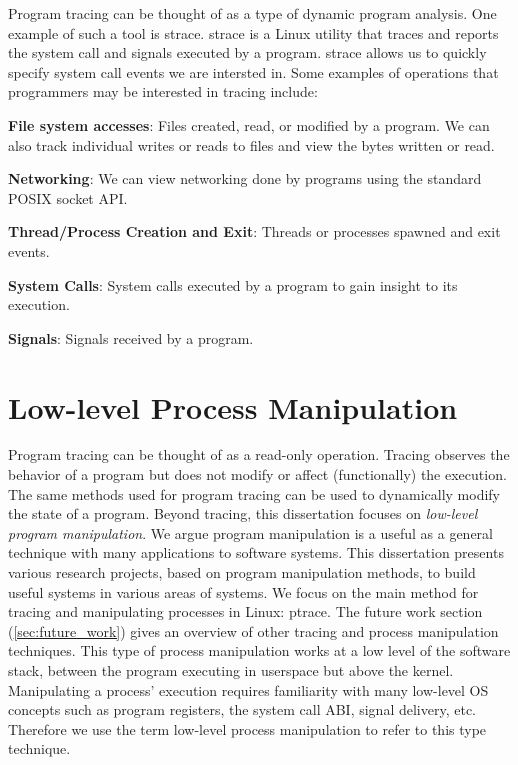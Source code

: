 Program tracing can be thought of as a type of dynamic program analysis. One example of such a tool is strace. strace is a Linux utility that traces and reports the system call and signals executed by a program. strace allows us to quickly specify system call events we are intersted in. Some examples of operations that programmers may be interested in tracing include:
\begin{compactitem}
\item \textbf{File system accesses}: Files created, read, or modified by a program. We can also track individual writes or reads to files and view the bytes written or read.
\item \textbf{Networking}: We can view networking done by programs using the standard POSIX socket API.
\item \textbf{Thread/Process Creation and Exit}: Threads or processes spawned and exit events.
\item \textbf{System Calls}: System calls executed by a program to gain insight to its execution.
\item \textbf{Signals}: Signals received by a program.
\end{compactitem}


\section{Low-level Process Manipulation}
Program tracing can be thought of as a read-only operation. Tracing observes the behavior of a program but does not modify or affect (functionally) the execution. The same methods used for program tracing can be used to dynamically modify the state of a program. Beyond tracing, this dissertation focuses on \textit{low-level program manipulation}. We argue program manipulation is a useful as a general technique with many applications to software systems. This dissertation presents various research projects, based on program manipulation methods, to build useful systems in various areas of systems. We focus on the main method for tracing and manipulating processes in Linux: ptrace. The future work section (\ref{sec:future_work}) gives an overview of other tracing and process manipulation techniques. This type of process manipulation works at a low level of the software stack, between the program executing in userspace but above the kernel. Manipulating a process' execution requires familiarity with many low-level OS concepts such as program registers, the system call ABI, signal delivery, etc. Therefore we use the term low-level process manipulation to refer to this type technique.

